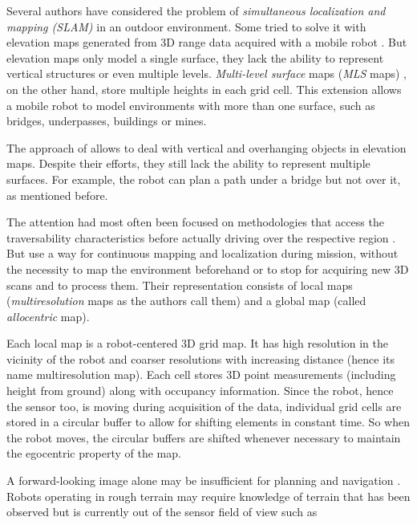 \documentclass[12pt,a4paper,table,dvipsnames,tikz]{report}
\newcommand{\term}{\textit}
\newcommand{\acronym}{\MakeUppercase}
\begin{document}
	Several authors have considered the problem of \term{simultaneous localization 
	and mapping (\acronym{slam})} in an outdoor environment. Some tried to solve it 
	with elevation maps generated from \acronym{3d} range data acquired with a mobile 
	robot \citep{Pfaff}. But elevation maps only model a single surface, they lack the 
	ability to represent vertical structures or even multiple levels. \term{Multi-level 
	surface} maps (\term{\acronym{mls}} maps) \citep{Triebel}, on the other hand, store 
	multiple heights in each grid cell. This extension allows a mobile robot to model 
	environments with more than one surface, such as bridges, underpasses, buildings 
	or mines. 
	\par
	The approach of \citet{Pfaff} allows to deal with vertical and 
	overhanging objects in elevation maps. Despite their efforts, they still lack 
	the ability to represent multiple surfaces. For example, the robot can plan a 
	path under a bridge but not over it, as mentioned before.
	\par
	The attention had most often been focused on methodologies that access the 
	traversability characteristics before actually driving over the respective region 
	\citep{Papadakis}. But \citet{Droeschel} use a way for continuous mapping and 
	localization during mission, without the necessity to map the environment 
	beforehand or to stop for acquiring new \acronym{3d} scans and to process them. 
	Their representation consists of local maps (\term{multiresolution} maps as the 
	authors call them) and a global map (called \term{allocentric} map).
	\par
	Each local map is a robot-centered \acronym{3d} grid map. It has high resolution 
	in the vicinity of the robot and coarser resolutions with increasing distance 
	(hence its name multiresolution map). Each cell stores \acronym{3d} point 
	measurements (including height from ground) along with occupancy information. 
	Since the robot, hence the sensor too, is moving during acquisition of the data, 
	individual grid cells are stored in a circular buffer to allow for shifting 
	elements in constant time. So when the robot moves, the circular buffers are 
	shifted whenever necessary to maintain the egocentric property of the map.
	\par
	A forward-looking image alone may be insufficient for planning and navigation 
	\citep{Kweon}. Robots operating in rough terrain may require knowledge of terrain 
	that has been observed but is currently out of the sensor field of view such as 
\end{document}
